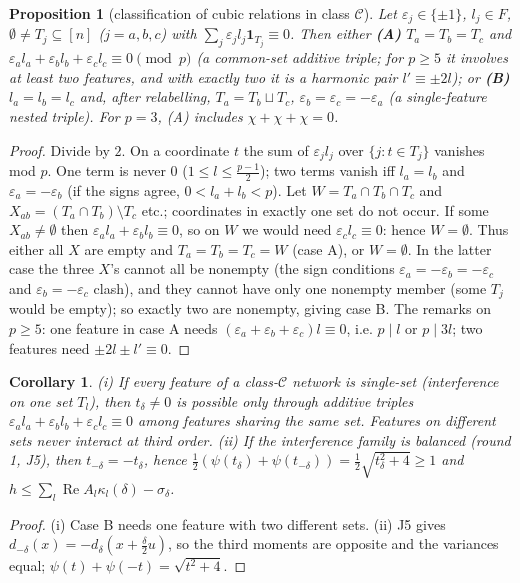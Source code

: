 \documentclass[11pt]{article}
\newtheorem{proposition}[theorem]{Proposition}
\newtheorem{corollary}[theorem]{Corollary}
\theoremstyle{remark}
\renewcommand{\Re}{\operatorname{Re}}
\begin{document}
\begin{proposition}[classification of cubic relations in class $\mathcal C$]\label{prop:cls}
Let $\varepsilon_j\in\{\pm1\}$, $l_j\in F$, $\emptyset\neq T_j\subseteq[n]$ ($j=a,b,c$) with $\sum_j\varepsilon_j l_j\mathbf 1_{T_j}\equiv0$. Then either
\textbf{(A)} $T_a=T_b=T_c$ and $\varepsilon_al_a+\varepsilon_bl_b+\varepsilon_cl_c\equiv0\pmod p$ (a common-set additive triple; for $p\ge5$ it
involves at least two features, and with exactly two it is a harmonic pair $l'\equiv\pm2l$); or
\textbf{(B)} $l_a=l_b=l_c$ and, after relabelling, $T_a=T_b\sqcup T_c$, $\varepsilon_b=\varepsilon_c=-\varepsilon_a$ (a single-feature
nested triple). For $p=3$, (A) includes $\chi+\chi+\chi=0$.
\end{proposition}
\begin{proof}
Divide by $2$. On a coordinate $t$ the sum of $\varepsilon_jl_j$ over $\{j:t\in T_j\}$ vanishes mod $p$. One term is never $0$ ($1\le l\le\frac{p-1}2$);
two terms vanish iff $l_a=l_b$ and $\varepsilon_a=-\varepsilon_b$ (if the signs agree, $0<l_a+l_b<p$). Let $W=T_a\cap T_b\cap T_c$ and
$X_{ab}=(T_a\cap T_b)\setminus T_c$ etc.; coordinates in exactly one set do not occur. If some $X_{ab}\ne\emptyset$ then
$\varepsilon_al_a+\varepsilon_bl_b\equiv0$, so on $W$ we would need $\varepsilon_cl_c\equiv0$: hence $W=\emptyset$. Thus either all $X$ are empty and
$T_a=T_b=T_c=W$ (case A), or $W=\emptyset$. In the latter case the three $X$'s cannot all be nonempty (the sign conditions
$\varepsilon_a=-\varepsilon_b=-\varepsilon_c$ and $\varepsilon_b=-\varepsilon_c$ clash), and they cannot have only one nonempty member (some $T_j$ would be empty);
so exactly two are nonempty, giving case B. The remarks on $p\ge5$: one feature in case A needs $(\varepsilon_a+\varepsilon_b+\varepsilon_c)l\equiv0$, i.e.
$p\mid l$ or $p\mid3l$; two features need $\pm2l\pm l'\equiv0$.
\end{proof}

\begin{corollary}\label{cor:skew}
(i) If every feature of a class-$\mathcal C$ network is single-set (interference on one set $T_l$), then $t_\delta\neq0$ is possible only through
additive triples $\varepsilon_al_a+\varepsilon_bl_b+\varepsilon_cl_c\equiv0$ among features \emph{sharing the same set}. Features on different
sets never interact at third order.
(ii) If the interference family is balanced (round 1, J5), then $t_{-\delta}=-t_\delta$, hence $\frac12(\psi(t_\delta)+\psi(t_{-\delta}))
=\frac12\sqrt{t_\delta^2+4}\ge1$ and $h\le\sum_l\Re A_l\kappa_l(\delta)-\sigma_\delta$.
\end{corollary}
\begin{proof}
(i) Case B needs one feature with two different sets. (ii) J5 gives $d_{-\delta}(x)=-d_\delta(x+\frac\delta2u)$, so the third moments are opposite
and the variances equal; $\psi(t)+\psi(-t)=\sqrt{t^2+4}$.
\end{proof}
\end{document}
